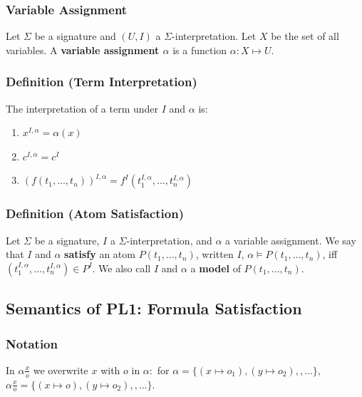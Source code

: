 \documentclass[conference, a4paper]{styles/acmsiggraph}
\begin{document}
        \subsubsection{Variable Assignment}
            Let $\Sigma$ be a signature and $(U,I)$ a $\Sigma$-interpretation.\newline
            Let $X$ be the set of all variables.\newline
            A \textbf{variable assignment $\alpha$} is a function $\alpha : X \mapsto U$.
        
        \subsubsection{Definition (Term Interpretation)}
            The interpretation of a term under $I$ and $\alpha$ is:
            \begin{enumerate}
                \item $x^{I,\alpha} = \alpha(x)$
                \item $c^{I,\alpha} = c^I$
                \item $(f(t_1,...,t_n))^{I,\alpha} = f^I(t^{I,\alpha}_1,...,t^{I,\alpha}_n)$
            \end{enumerate}
        
        \subsubsection{Definition (Atom Satisfaction)}
            Let $\Sigma$ be a signature, $I$ a $\Sigma$-interpretation, and $\alpha$ a variable assignment.\newline
            We say that $I$ and $\alpha$ \textbf{satisfy} an atom $P(t_1,...,t_n)$, written $I$, $\alpha \vDash P(t_1,...,t_n)$, iff $(t^{I,\alpha}_1,...,t^{I,\alpha}_n) \in P^I$.\newline
            We also call $I$ and $\alpha$ a \textbf{model} of $P(t_1,...,t_n)$.
    
    
    \subsection{Semantics of PL1: Formula Satisfaction}
        \subsubsection{Notation}
            In $\alpha \frac{x}{o}$ we overwrite $x$ with $o$ in $\alpha:$ for $\alpha = \{(x \mapsto o_1),(y \mapsto o_2),,...\}$, $\alpha \frac{x}{o} = \{(x \mapsto o),(y \mapsto o_2),,...\}$.
        
\end{document}
